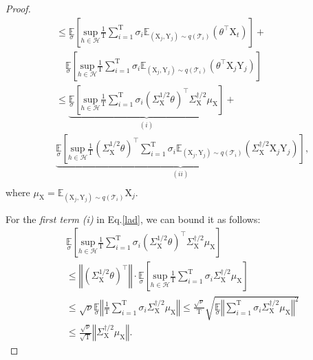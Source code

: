\begin{proof}
\begin{equation}
\begin{aligned}
    &\leq \underset{\sigma}{\mathbb E} \left[\underset{h\in\mathcal{H}}{\text{sup}}\frac{1}{\mathrm{T}}\sum_{i=1}^\mathrm{T}\sigma_i \mathbb E_{(\mathrm{X}_j,\mathrm{Y}_j) \sim q(\mathcal{T}_i)}\left({\theta^\top\mathrm{X}_t}\right)\right] + \\ 
    & \quad \underset{\sigma}{\mathbb E} \left[\underset{h\in\mathcal{H}}{\text{sup}}\frac{1}{\mathrm{T}}\sum_{i=1}^\mathrm{T}\sigma_i \mathbb E_{(\mathrm{X}_j,\mathrm{Y}_j) \sim q(\mathcal{T}_i)}\left(\theta^\top\mathrm{X}_j\mathrm{Y}_j\right)\right]\\
    &\leq \underbrace{\underset{\sigma}{\mathbb E} \left[\underset{h\in\mathcal{H}}{\text{sup}}\frac{1}{\mathrm{T}}\sum_{i=1}^\mathrm{T}\sigma_i (\Sigma_{\mathrm{X}}^{1/2}\theta)^\top\Sigma_\mathrm{X}^{\dagger/2}\mu_{\mathrm{X}}\right]}_{(i)} + \\ 
    &\underbrace{\underset{\sigma}{\mathbb E} \left[\underset{h\in\mathcal{H}}{\text{sup}}\frac{1}{\mathrm{T}}(\Sigma_\mathrm{X}^{1/2}\theta)^\top\sum_{i=1}^\mathrm{T}\sigma_i \mathbb E_{(\mathrm{X}_j,\mathrm{Y}_j) \sim q(\mathcal{T}_i)} \left(\Sigma_\mathrm{X}^{\dagger/2}\mathrm{X}_j\mathrm{Y}_j\right)\right]}_{(ii)}, \\
\end{aligned}
\end{equation}
where $\mu_\mathrm{X}=\mathbb E_{(\mathrm{X}_j,\mathrm{Y}_j)\sim q(\mathcal{T}_i)}\mathrm{X}_j$.

For the \textit{first term (i)} in Eq.\ref{lad}, we can bound it as follows:
\begin{equation}
\label{lad_first}
    \begin{aligned}    
    &\underset{\sigma}{\mathbb E} \left[\underset{h\in\mathcal{H}}{\text{sup}}\frac{1}{\mathrm{T}}\sum_{i=1}^\mathrm{T}\sigma_i (\Sigma_{\mathrm{X}}^{1/2}\theta)^\top\Sigma_\mathrm{X}^{\dagger/2}\mu_{\mathrm{X}}\right] \\
    &\leq \left\Vert(\Sigma_{\mathrm{X}}^{1/2}\theta)^\top\right\Vert \cdot \underset{\sigma}{\mathbb E}\left[\underset{h\in\mathcal{H}}{\text{sup}}\frac{1}{\mathrm{T}}\sum_{i=1}^\mathrm{T}\sigma_i\Sigma_\mathrm{X}^{\dagger/2}\mu_{\mathrm{X}}\right] \\
    &\leq \sqrt{\nu} \underset{\sigma}{\mathbb E}\left\Vert \frac{1}{\mathrm{T}}\sum_{i=1}^\mathrm{T}\sigma_i\Sigma_\mathrm{X}^{\dagger/2}\mu_{\mathrm{X}}\right\Vert \leq \frac{\sqrt{\nu}}{\mathrm{T}}\sqrt{\underset{\sigma}{\mathbb E}\left\Vert \sum_{i=1}^\mathrm{T}\sigma_i\Sigma_\mathrm{X}^{\dagger/2}\mu_\mathrm{X}\right\Vert^2} \\
    &\leq \frac{\sqrt{\nu}}{\sqrt{\mathrm T}}\left\Vert\Sigma_\mathrm{X}^{\dagger/2}\mu_\mathrm{X}\right\Vert.
\end{aligned}
\end{equation}


\end{proof}
